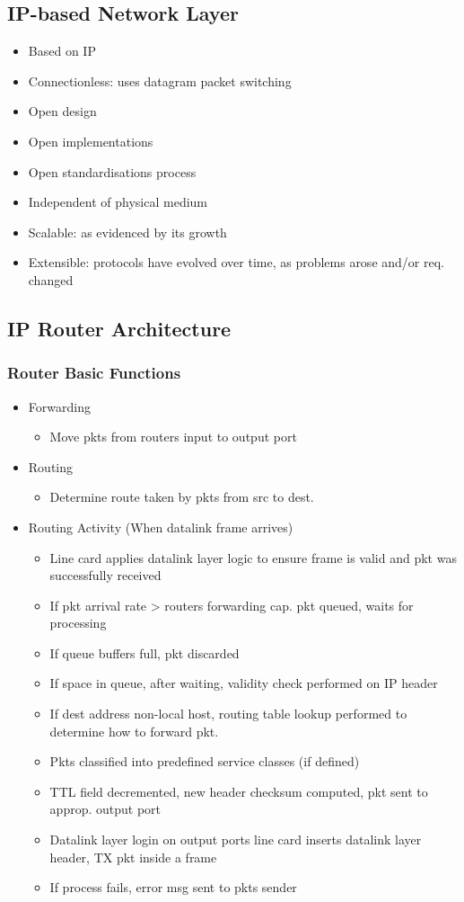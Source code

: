 \subsection{IP-based Network Layer}
\begin{itemize}
	\item Based on IP
	\item Connectionless: uses datagram packet switching
	\item Open design
	\item Open implementations
	\item Open standardisations process
	\item Independent of physical medium
	\item Scalable: as evidenced by its growth
	\item Extensible: protocols have evolved over time, as problems arose
		and/or req. changed
\end{itemize}
\subsection{IP Router Architecture}
\subsubsection{Router Basic Functions}
\begin{itemize}
	\item Forwarding
	\begin{itemize}
		\item Move pkts from routers input to output port
	\end{itemize}
	\item Routing
	\begin{itemize}
		\item Determine route taken by pkts from src to dest.
	\end{itemize}
	\item Routing Activity (When datalink frame arrives)
	\begin{itemize}
		\item Line card applies datalink layer logic to ensure frame is
			valid and pkt was successfully received
		\item If pkt arrival rate > routers forwarding cap. pkt queued,
			waits for processing
		\item If queue buffers full, pkt discarded
		\item If space in queue, after waiting, validity check performed
			on IP header
		\item If dest address non-local host, routing table lookup
			performed to determine how to forward pkt.
		\item Pkts classified into predefined service classes (if
			defined)
		\item TTL field decremented, new header checksum computed, pkt
			sent to approp. output port
		\item Datalink layer login on output ports line card inserts
			datalink layer header, TX pkt inside a frame
		\item If process fails, error msg sent to pkts sender
	\end{itemize}
\end{itemize}
